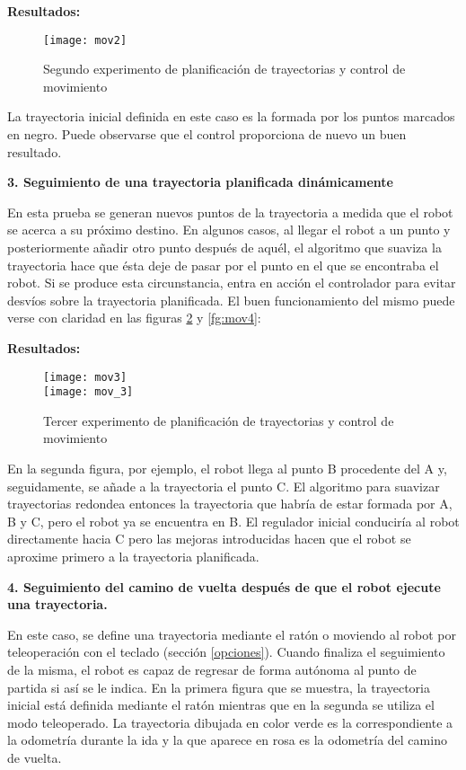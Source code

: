 \textbf{Resultados:}
\begin{figure}[h]
  \centering\texttt{[image: mov2]}\\
  \caption{Segundo experimento de planificación de trayectorias y control de movimiento}\label{fg:mov2}
\end{figure}

La trayectoria inicial definida en este caso es la formada por los puntos marcados en negro. Puede observarse que el control proporciona de nuevo un buen resultado.

\noindent
\textbf{\textbf{3.} Seguimiento de una trayectoria planificada dinámicamente}

En esta prueba se generan nuevos puntos de la trayectoria a medida que el robot se acerca a su próximo destino. En algunos casos, al llegar el robot a un punto y posteriormente añadir otro punto después de aquél, el algoritmo que suaviza la trayectoria hace que ésta deje de pasar por el punto en el que se encontraba el robot. Si se produce esta circunstancia, entra en acción el controlador para evitar desvíos sobre la trayectoria planificada. El buen funcionamiento del mismo puede verse con claridad en las figuras \ref{fg:mov3} y \ref{fg:mov4}:



\textbf{Resultados:}
\begin{figure}[h]
  \centering\texttt{[image: mov3]}\\
  \vspace{2cm}\texttt{[image: mov\_3]}
  \caption{Tercer experimento de planificación de trayectorias y control de movimiento}\label{fg:mov3}
\end{figure}


En la segunda figura, por ejemplo, el robot llega al punto B procedente del A y, seguidamente, se añade a la trayectoria el punto C. El algoritmo para suavizar trayectorias redondea entonces la trayectoria que habría de estar formada por A, B y C, pero el robot ya se encuentra en B. El regulador inicial conduciría al robot directamente hacia C pero las mejoras introducidas hacen que el robot se aproxime primero a la trayectoria planificada.

\noindent
\textbf{\textbf{4.} Seguimiento del camino de vuelta después de que el robot ejecute una trayectoria.}

En este caso, se define una trayectoria mediante el ratón o moviendo al robot por teleoperación con el teclado (sección \ref{opciones}). Cuando finaliza el seguimiento de la misma, el robot es capaz de regresar de forma autónoma al punto de partida si así se le indica. En la primera figura que se muestra, la trayectoria inicial está definida mediante el ratón mientras que en la segunda se utiliza el modo teleoperado. La trayectoria dibujada en color verde es la correspondiente a la odometría durante la ida y la que aparece en rosa es la odometría del camino de vuelta.

